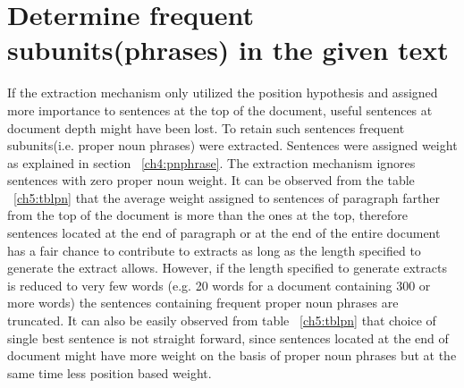 \section{Determine frequent subunits(phrases) in the given text}
If the extraction mechanism only utilized the position hypothesis and assigned more importance to sentences at the top of the document, useful sentences at document depth
might have been lost. To retain such sentences frequent subunits(i.e. proper noun phrases) were extracted. Sentences were assigned weight as explained in section ~\ref{ch4:pnphrase}. 
The extraction mechanism ignores sentences with zero proper noun weight. It can be observed from the table ~\ref{ch5:tblpn} that the average weight assigned to sentences
of paragraph farther from the top of the document is more than the ones at the top, therefore sentences located at the end of paragraph or at the end of the entire 
document has a fair chance to contribute to extracts as long as the length specified to generate the extract allows. However, if the length specified to generate extracts
is reduced to very few words (e.g. 20 words for a document containing 300 or more words) the sentences containing frequent proper noun phrases are truncated.
It can also be easily observed from table ~\ref{ch5:tblpn} that choice of single best sentence is not straight forward, since sentences located at the end of document
might have more weight on the basis of proper noun phrases but at the same time less position based weight. 

